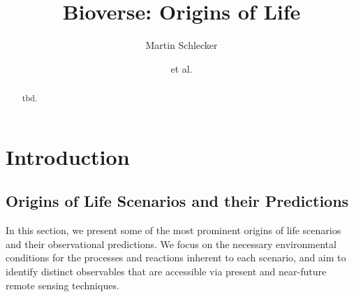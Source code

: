 \documentclass[modern,linenumbers]{aastex631}
\begin{document}
\title{Bioverse: Origins of Life}

\author{Martin Schlecker}
\author{et al.}

\begin{abstract}
    tbd.
\end{abstract}

\section{Introduction}
\label{sec:intro}

\subsection{Origins of Life Scenarios and their Predictions}\label{sec:predictions}
\label{sec:ool_scenarios}
In this section, we present some of the most prominent origins of life scenarios and their observational predictions.
We focus on the necessary environmental conditions for the processes and reactions inherent to each scenario, and aim to identify distinct observables that are accessible via present and near-future remote sensing techniques.
\end{document}
